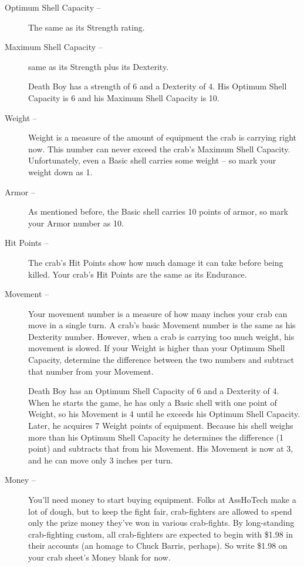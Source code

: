 \documentclass[a4paper,10pt]{article}
\begin{document}
\begin{description}
 \item[Optimum Shell Capacity --] The same as its Strength rating.
 \item[Maximum Shell Capacity --] same as its Strength plus its Dexterity.
 \item[] Death Boy has a strength of 6 and a Dexterity of 4. His Optimum Shell Capacity is 6 and his Maximum Shell Capacity is 10.

 \item[Weight --] Weight is a measure of the amount of equipment the crab is carrying right now. This number can never exceed the crab's Maximum Shell Capacity. Unfortunately, even a Basic shell carries some weight -- so mark your weight down as 1.

 \item[Armor --] As mentioned before, the Basic shell carries 10 points of armor, so mark your Armor number as 10.

 \item[Hit Points --] The crab's Hit Points show how much damage it can take before being killed. Your crab's Hit Points are the same as its Endurance.

 \item[Movement --] Your movement number is a measure of how many inches your crab can move in a single turn. A crab's basic Movement number is the same as his Dexterity number. However, when a crab is carrying too much weight, his movement is slowed. If your Weight is higher than your Optimum Shell Capacity, determine the difference between the two numbers and subtract that number from your Movement.
 \item[] Death Boy has an Optimum Shell Capacity of 6 and a Dexterity of 4. When he starts the game, he has only a Basic shell with one point of Weight, so his Movement is 4 until he exceeds his Optimum Shell Capacity. Later, he acquires 7 Weight points of equipment. Because his shell weighs more than his Optimum Shell Capacity he determines the difference (1 point) and subtracts that from his Movement. His Movement is now at 3, and he can move only 3 inches per turn.

 \item[Money --] You'll need money to start buying equipment. Folks at AssHoTech make a lot of dough, but to keep the fight fair, crab-fighters are allowed to spend only the prize money they've won in various crab-fights. By long-standing crab-fighting custom, all crab-fighters are expected to begin with \$1.98 in their accounts (an homage to Chuck Barris, perhaps). So write \$1.98 on your crab sheet's Money blank for now.
 \end{description}
\end{document}
